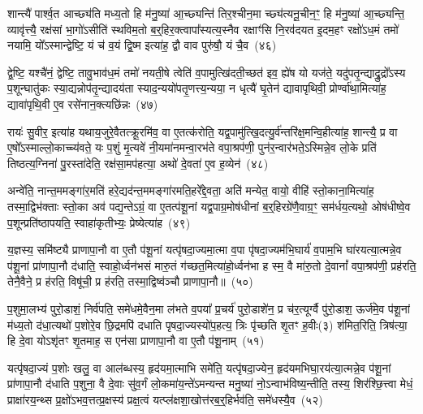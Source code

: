शान्त्यै॑ पार्श्व॒त आच्छ्य॑ति मध्य॒तो हि म॑नु॒ष्या॑ आ॒च्छ्यन्ति॑ तिर॒श्चीन॒मा च्छ्य॑त्यनू॒चीन॒ꣳ॒ हि म॑नु॒ष्या॑ आ॒च्छ्यन्ति॒ व्यावृ॑त्त्यै॒ रक्ष॑सां भा॒गो॑\-ऽसीति॑ स्थविम॒तो ब॒र्॒\mbox{}हिर॒क्त्वापा᳚स्यत्य॒स्नैव रक्षाꣳ॑सि नि॒रव॑दयत इ॒दम॒हꣳ रक्षो॑\-ऽध॒मं तमो॑ नयामि॒ यो᳚\-ऽस्मान्द्वेष्टि॒ यं च॑ व॒यं द्वि॒ष्म इत्या॑ह॒ द्वौ वाव पुरु॑षौ॒ यं चै॒व~(४६)\ip

द्वे॒ष्टि॒ यश्चै॑नं॒ द्वेष्टि॒ तावु॒भाव॑ध॒मं तमो॑ नयती॒षे त्वेति॑ व॒पामुत्खि॑दती॒च्छत॑ इव॒ ह्ये॑ष यो यज॑ते॒ यदु॑पतृ॒न्द्याद्रु॒द्रो᳚\-ऽस्य प॒शून्घातु॑कः स्या॒द्यन्नोप॑तृ॒न्द्यादय॑ता स्याद॒न्ययो॑पतृ॒णत्त्य॒न्यया॒ न धृत्यै॑ घृ॒तेन॑ द्यावा\-पृथिवी॒ प्रोर्ण्वा॑था॒मित्या॑ह॒ द्यावा॑\-पृथि॒वी ए॒व रसे॑नान॒क्त्यछि॑न्नः~(४७)\ip

रायः॑ सु॒वीर॒ इत्या॑ह यथाय॒जुरे॒वैतत्क्रू॒रमि॑व॒ वा ए॒तत्क॑रोति॒ यद्व॒पामु॑त्खि॒दत्यु॒र्व॑न्तरि॑क्ष॒मन्वि॒हीत्या॑ह॒ शान्त्यै॒ प्र वा ए॒षो᳚\-ऽस्माल्लो॒काच्च्य॑वते॒ यः प॒शुं मृ॒त्यवे॑ नी॒यमा॑नमन्वा॒रभ॑ते वपा॒श्रप॑णी॒ पुन॑र॒न्वार॑भते॒\-ऽस्मिन्ने॒व लो॒के प्रति॑ तिष्ठत्य॒ग्निना॑ पु॒रस्ता॑देति॒ रक्ष॑सा॒मप॑हत्या॒ अथो॑ दे॒वता॑ ए॒व ह॒व्येन॑~(४८)\ip

अन्वे॑ति॒ नान्त॒ममङ्गा॑र॒मति॑ हरे॒द्यद॑न्त॒ममङ्गा॑रमति॒हरे᳚द्दे॒वता॒ अति॑ मन्येत॒ वायो॒ वीहि॑ स्तो॒काना॒मित्या॑ह॒ तस्मा॒द्विभ॑क्ताः स्तो॒का अव॑ पद्य॒न्ते\-ऽग्रं॒ वा ए॒तत्प॑शू॒नां यद्व॒पाग्र॒मोष॑धीनां ब॒र्॒\mbox{}हिरग्रे॑णै॒वाग्र॒ꣳ॒ सम॑र्धय॒त्यथो॒ ओष॑धीष्वे॒व प॒शून्प्रति॑\-ष्ठापयति॒ स्वाहा॑कृतीभ्यः॒ प्रेष्येत्या॑ह~(४९)\ip

य॒ज्ञस्य॒ समि॑ष्ट्यै प्राणापा॒नौ वा ए॒तौ प॑शू॒नां यत्पृ॑षदा॒ज्यमा॒त्मा व॒पा पृ॑षदा॒ज्यम॑भि॒घार्य॑ व॒पाम॒भि घा॑रयत्या॒त्मन्ने॒व प॑शू॒नां प्रा॑णापा॒नौ द॑धाति॒ स्वाहो॒र्ध्वन॑भसं मारु॒तं ग॑च्छत॒मित्या॑हो॒र्ध्वन॑भा ह स्म॒ वै मा॑रु॒तो दे॒वानां᳚ वपा॒श्रप॑णी॒ प्रह॑रति॒ तेनै॒वैने॒ प्र ह॑रति॒ विषू॑ची॒ प्र ह॑रति॒ तस्मा॒द्विष्व॑ञ्चौ प्राणापा॒नौ॥~(५०)\ip

{\anuvakamend[{स्वधि॑तिश्चै॒वाच्छि॑न्नो ह॒व्येने॒ष्येत्या॑ह॒ षट्च॑त्वारिꣳशच्च}]}

प॒शुमा॒लभ्य॑ पुरो॒डाशं॒ निर्व॑पति॒ समे॑धमे॒वैन॒मा ल॑भते व॒पया᳚ प्र॒चर्य॑ पुरो॒डाशे॑न॒ प्र च॑र॒त्यूर्ग्वै पु॑रो॒डाश॒ ऊर्ज॑मे॒व प॑शू॒नां म॑ध्य॒तो द॑धा॒त्यथो॑ प॒शोरे॒व छि॒द्रमपि॑ दधाति पृषदा॒ज्यस्यो॑प॒हत्य॒ त्रिः पृ॑च्छति शृ॒तꣳ ह॒वीः(३) श॑मित॒रिति॒ त्रिष॑त्या॒ हि दे॒वा यो\-ऽशृ॑तꣳ शृ॒तमाह॒ स एन॑सा प्राणापा॒नौ वा ए॒तौ प॑शू॒नाम्~(५१)\ip

यत्पृ॑षदा॒ज्यं प॒शोः खलु॒ वा आल॑ब्धस्य॒ हृद॑यमा॒त्माभि समे॑ति॒ यत्पृ॑षदा॒ज्येन॒ हृद॑यमभिघा॒रय॑त्या॒त्मन्ने॒व प॑शू॒नां प्रा॑णापा॒नौ द॑धाति प॒शुना॒ वै दे॒वाः सु॑व॒र्गं लो॒कमा॑य॒न्ते॑\-ऽमन्यन्त मनु॒ष्या॑ नो॒\-ऽन्वाभ॑विष्य॒न्तीति॒ तस्य॒ शिर॑श्छि॒त्त्वा मेधं॒ प्राक्षा॑रय॒न्थ्स प्र॒क्षो॑\-ऽभव॒त्तत्प्र॒क्षस्य॑ प्रक्ष॒त्वं यत्प्ल॑क्षशा॒खोत्त॑रब॒र्॒\mbox{}हिर्भव॑ति॒ समे॑धस्यै॒व~(५२)\ip

